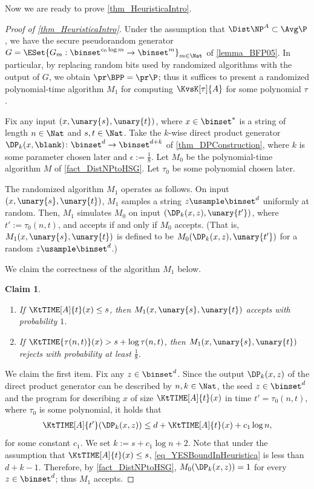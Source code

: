 \documentclass[11pt]{article}
\numberwithin{equation}{section}
\newtheorem{claim}[theorem]{Claim}
\theoremstyle{definition}
\theoremstyle{plain}
\begin{document}
Now we are ready to prove \cref{thm_HeuristicaIntro}.
\begin{proof}
  [Proof of \cref{thm_HeuristicaIntro}]
  Under the assumption that $\Dist\NP^A \subset \Avg\P$, we have the secure pseudorandom generator
  $G = \ESet{G_m : \binset^{c_0 \log m} \to \binset^m }_{m \in \Nat}$
  of \cref{lemma_BFP05}.
  In particular,
  by replacing random bits used by randomized algorithms
  with the output of $G$,
  we obtain $\pr\BPP = \pr\P$;
  thus
  it suffices to present a randomized polynomial-time algorithm $M_1$
  for computing $\KvsK[\tau]{A}$ for some polynomial $\tau$.


  Fix any input $(x, \unary{s}, \unary{t})$, where $x \in \binset^*$ is a string of length $n \in \Nat$
  and $s, t \in \Nat$.
  Take the $k$-wise direct product generator $\DP_k(x, \blank) \colon \binset^d \to \binset^{d + k}$ of \cref{thm_DPConstruction},
  where $k$ is some parameter chosen later and $\epsilon := \frac{1}{8}$.
  Let $M_0$ be the polynomial-time algorithm $M$ of \cref{fact_DistNPtoHSG}.
  Let $\tau_0$ be some polynomial chosen later.


  The randomized algorithm $M_1$ operates as follows.
  On input $(x, \unary{s}, \unary{t})$,
  $M_1$ samples a string $z \usample \binset^d$ uniformly at random.
  Then,
  $M_1$ simulates $M_0$ on input $(\DP_k(x, z), \unary{t'})$, where $t' := \tau_0(n, t)$,
  and accepts if and only if $M_0$ accepts.
  (That is, $M_1(x, \unary{s}, \unary{t})$ is defined to be $M_0(\DP_k(x, z), \unary{t'})$ for a random $z \usample \binset^d$.)

  We claim the correctness of the algorithm $M_1$ below.
  \begin{claim}
    \label{claim_CorrectnessOfHeuristica}
    \hspace{0em}
    \begin{enumerate}
      \item
            If $\KtTIME[A]{t}(x) \le s$,
            then $M_1(x, \unary{s}, \unary{t})$ accepts with probability $1$.
      \item
            If $\KtTIME{\tau(n, t)}(x) > s + \log \tau(n, t)$,
            then $M_1(x, \unary{s}, \unary{t})$ rejects with probability at least $\frac{1}{8}$.
    \end{enumerate}
  \end{claim}

  We claim the first item.
  Fix any ${z} \in \binset^d$.
  Since the output $\DP_k(x, {z})$ of
  the direct product generator
  can be described by
  $n, k \in \Nat$,
  the seed ${z} \in \binset^d$
  and
  the program for describing $x$ of size $\KtTIME[A]{t}(x)$
  in time $t' = \tau_0(n, t)$,
  where $\tau_0$ is some polynomial,
  it holds that
  \begin{align}
    \label{eq_YESBoundInHeuristica}
    \KtTIME[A]{t'}(\DP_k(x, {z})) \le d + \KtTIME[A]{t}(x) + c_1 \log n,
  \end{align}
  for some constant $c_1$.
  We set $k := s + c_1 \log n + 2$.
  Note that under the assumption that $\KtTIME[A]{t}(x) \le s$, \cref{eq_YESBoundInHeuristica} is less than $d + k - 1$.
  Therefore, by \cref{fact_DistNPtoHSG},
  $M_0(\DP_k(x, {z})) = 1$ for every ${z} \in \binset^d$;
  thus $M_1$ accepts.


\end{proof}
\end{document}
